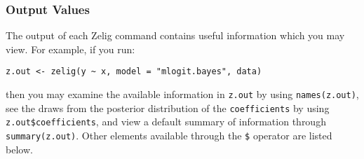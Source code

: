 \subsubsection{Output Values}

The output of each Zelig command contains useful information which you may
view. For example, if you run:
\begin{verbatim}
z.out <- zelig(y ~ x, model = "mlogit.bayes", data)
\end{verbatim}

\noindent then you may examine the available information in \texttt{z.out} by
using \texttt{names(z.out)}, see the draws from the posterior distribution of
the \texttt{coefficients} by using \texttt{z.out\$coefficients}, and view a default
summary of information through \texttt{summary(z.out)}. Other elements
available through the \texttt{\$} operator are listed below.

